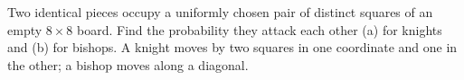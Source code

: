 Two identical pieces occupy a uniformly chosen pair of distinct squares of an empty $8\times8$ board. Find the probability they attack each other (a) for knights and (b) for bishops. A knight moves by two squares in one coordinate and one in the other; a bishop moves along a diagonal.
